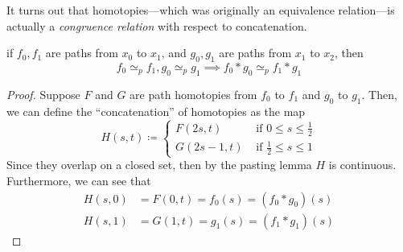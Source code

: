   It turns out that homotopies---which was originally an equivalence relation---is actually a \textit{congruence relation} with respect to concatenation. 

  \begin{lemma}
    if $f_0, f_1$ are paths from $x_0$ to $x_1$, and $g_0, g_1$ are paths from $x_1$ to $x_2$, then 
    \begin{equation}
      f_0 \simeq_p f_1, g_0 \simeq_p g_1 \implies f_0 \ast g_0 \simeq_p f_1 \ast g_1
    \end{equation}
  \end{lemma}
  \begin{proof}
    Suppose $F$ and $G$ are path homotopies from $f_0$ to $f_1$ and $g_0$ to $g_1$. Then, we can define the ``concatenation'' of homotopies as the map
    \begin{equation}
      H(s, t) \coloneqq \begin{cases} 
        F(2s, t) & \text{ if } 0 \leq s \leq \frac{1}{2} \\ 
        G(2s - 1, t) & \text{ if } \frac{1}{2} \leq s \leq 1 
      \end{cases}
    \end{equation}
    Since they overlap on a closed set, then by the pasting lemma $H$ is continuous. Furthermore, we can see that 
    \begin{align}
      H(s, 0) & = F(0, t) = f_0 (s) = (f_0 \ast g_0) (s) \\ 
      H(s, 1) & = G(1, t) = g_1 (s) = (f_1 \ast g_1) (s) 
    \end{align}
  \end{proof}

